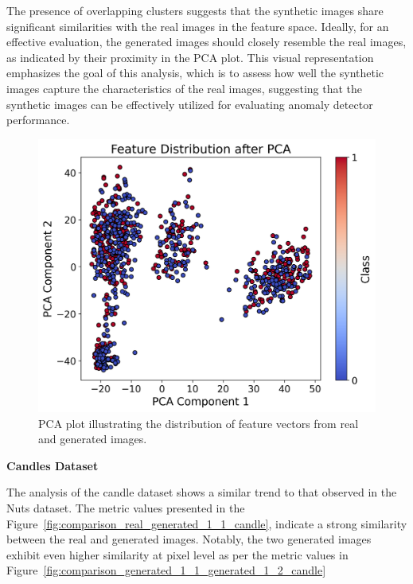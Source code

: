\documentclass[12pt,DIV14,BCOR12mm,a4paper,footinclude=false,headinclude,parskip=half-,twoside,openright,cleardoublepage=empty,toc=index,bibliography=totoc,listof=totoc]{scrreprt}
\numberwithin{equation}{chapter}
\begin{document}
The presence of overlapping clusters suggests that the synthetic images share significant similarities with the real images in the feature space. Ideally, for an effective evaluation, the generated images should closely resemble the real images, as indicated by their proximity in the PCA plot. 
This visual representation emphasizes the goal of this analysis, which is to assess how well the synthetic images capture the characteristics of the real images, suggesting that the synthetic images can be effectively utilized for evaluating anomaly detector performance.

\begin{figure}
    \centering
    \includegraphics[scale=0.7]{../media/feature_distribution_pca.png}
    \caption{PCA plot illustrating the distribution of feature vectors from real and generated images.}
    \label{fig:pca-plot}
\end{figure}




\textbf{Candles Dataset}

The analysis of the candle dataset shows a similar trend to that observed in the Nuts dataset. The metric values presented in the Figure~\ref{fig:comparison_real_generated_1_1_candle}, indicate a strong similarity between the real and generated images. Notably, the two generated images exhibit even higher similarity at pixel level as per the metric values in Figure~\ref{fig:comparison_generated_1_1_generated_1_2_candle}
\end{document}
